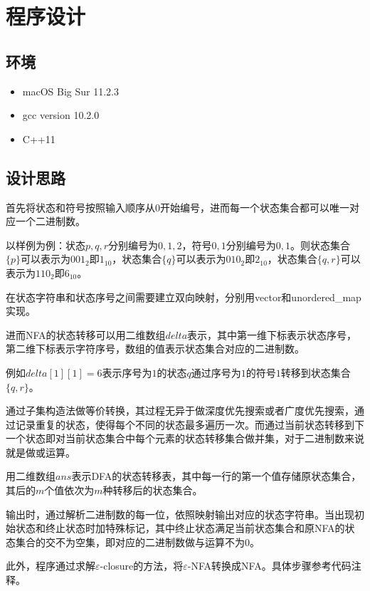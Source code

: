 \documentclass[lang=cn,11pt,a4paper,cite=authornum]{paper}
\begin{document}
\section{程序设计}

\subsection{环境}

\begin{itemize}
    \item macOS Big Sur 11.2.3
    \item gcc version 10.2.0
    \item C++11
\end{itemize}

\subsection{设计思路}

首先将状态和符号按照输入顺序从$0$开始编号，进而每一个状态集合都可以唯一对应一个二进制数。

以样例为例：状态$p,q,r$分别编号为$0,1,2$，符号$0,1$分别编号为$0,1$。则状态集合$\{p\}$可以表示为$001_2$即$1_{10}$，状态集合$\{q\}$可以表示为$010_2$即$2_{10}$，状态集合$\{q,r\}$可以表示为$110_2$即$6_{10}$。

在状态字符串和状态序号之间需要建立双向映射，分别用vector和unordered\_map实现。

进而NFA的状态转移可以用二维数组$delta$表示，其中第一维下标表示状态序号，第二维下标表示字符序号，数组的值表示状态集合对应的二进制数。

例如$delta[1][1]=6$表示序号为$1$的状态$q$通过序号为$1$的符号$1$转移到状态集合$\{q,r\}$。

通过子集构造法做等价转换，其过程无异于做深度优先搜索或者广度优先搜索，通过记录重复的状态，使得每个不同的状态最多遍历一次。而通过当前状态转移到下一个状态即对当前状态集合中每个元素的状态转移集合做并集，对于二进制数来说就是做或运算。

用二维数组$ans$表示DFA的状态转移表，其中每一行的第一个值存储原状态集合，其后的$m$个值依次为$m$种转移后的状态集合。

输出时，通过解析二进制数的每一位，依照映射输出对应的状态字符串。当出现初始状态和终止状态时加特殊标记，其中终止状态满足当前状态集合和原NFA的状态集合的交不为空集，即对应的二进制数做与运算不为$0$。

此外，程序通过求解$\varepsilon$-closure的方法，将$\varepsilon$-NFA转换成NFA。具体步骤参考代码注释。
\end{document}
